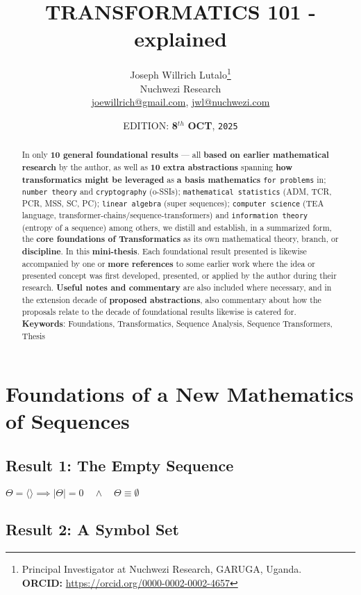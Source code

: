 \documentclass[12pt,a4paper]{article}
\title{TRANSFORMATICS 101 - explained}
\author{Joseph Willrich Lutalo\thanks{Principal Investigator at Nuchwezi Research, GARUGA, Uganda.\\ \textbf{ORCID:} \url{https://orcid.org/0000-0002-0002-4657}}\\Nuchwezi Research\\\href{mailto:joewillrich@gmail.com}{joewillrich@gmail.com}, \href{mailto:jwl@nuchwezi.com}{jwl@nuchwezi.com}}
\date {EDITION: \textbf{8}$^{th}$ \textbf{OCT}, \texttt{2025}}
\begin{document}
\maketitle

\begin{abstract}
In only \textbf{10 general foundational results}\cite{Lutalo2025_trans_101}\cite{lutalo_2025_trans101_1page} --- all \textbf{based on earlier mathematical research} by the author, as well as \textbf{10 extra abstractions} spanning \textbf{how transformatics might be leveraged} as \textbf{a basis mathematics} \texttt{for problems} in; \texttt{number theory} and \texttt{cryptography} (o-SSIs); \texttt{mathematical statistics} (ADM, TCR, PCR, MSS, SC, PC); \texttt{linear algebra} (super sequences); \texttt{computer science} (TEA language, transformer-chains/sequence-transformers) and \texttt{information theory} (entropy of a sequence) among others, we distill and establish, in a summarized form, the \textbf{core foundations of Transformatics}\cite{transformatics} as its own mathematical theory, branch, or \textbf{discipline}. In this \textbf{mini-thesis}. Each foundational result presented is likewise accompanied by one or \textbf{more references} to some earlier work where the idea or presented concept was first developed, presented, or applied by the author during their research. \textbf{Useful notes and commentary} are also included where necessary, and in the extension decade of \textbf{proposed abstractions}, also commentary about how the proposals relate to the decade of foundational results likewise is catered for.
 \newline\newline
     \textbf{Keywords}: Foundations, Transformatics, Sequence Analysis,  Sequence Transformers, Thesis
\end{abstract}

\section{Foundations of a New Mathematics of Sequences}

\subsection{Result 1: The Empty Sequence\cite{lnspaper}}

$\Theta = \langle \rangle \implies |\Theta| = 0 \quad \land \quad \Theta \equiv \emptyset$

\subsection{Result 2: A Symbol Set\cite{Lutalo2024gtnc}}
\end{document}
